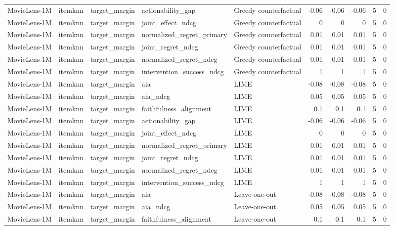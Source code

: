 \begin{table}[t]
{\begin{tabular}{lllllrrrrr}
MovieLens-1M & itemknn & target\_margin & actionability\_gap & Greedy counterfactual & -0.06 & -0.06 & -0.06 & 5 & 0 \\
MovieLens-1M & itemknn & target\_margin & joint\_effect\_ndcg & Greedy counterfactual & 0 & 0 & 0 & 5 & 0 \\
MovieLens-1M & itemknn & target\_margin & normalized\_regret\_primary & Greedy counterfactual & 0.01 & 0.01 & 0.01 & 5 & 0 \\
MovieLens-1M & itemknn & target\_margin & joint\_regret\_ndcg & Greedy counterfactual & 0.01 & 0.01 & 0.01 & 5 & 0 \\
MovieLens-1M & itemknn & target\_margin & normalized\_regret\_ndcg & Greedy counterfactual & 0.01 & 0.01 & 0.01 & 5 & 0 \\
MovieLens-1M & itemknn & target\_margin & intervention\_success\_ndcg & Greedy counterfactual & 1 & 1 & 1 & 5 & 0 \\
MovieLens-1M & itemknn & target\_margin & aia & LIME & -0.08 & -0.08 & -0.08 & 5 & 0 \\
MovieLens-1M & itemknn & target\_margin & aia\_ndcg & LIME & 0.05 & 0.05 & 0.05 & 5 & 0 \\
MovieLens-1M & itemknn & target\_margin & faithfulness\_alignment & LIME & 0.1 & 0.1 & 0.1 & 5 & 0 \\
MovieLens-1M & itemknn & target\_margin & actionability\_gap & LIME & -0.06 & -0.06 & -0.06 & 5 & 0 \\
MovieLens-1M & itemknn & target\_margin & joint\_effect\_ndcg & LIME & 0 & 0 & 0 & 5 & 0 \\
MovieLens-1M & itemknn & target\_margin & normalized\_regret\_primary & LIME & 0.01 & 0.01 & 0.01 & 5 & 0 \\
MovieLens-1M & itemknn & target\_margin & joint\_regret\_ndcg & LIME & 0.01 & 0.01 & 0.01 & 5 & 0 \\
MovieLens-1M & itemknn & target\_margin & normalized\_regret\_ndcg & LIME & 0.01 & 0.01 & 0.01 & 5 & 0 \\
MovieLens-1M & itemknn & target\_margin & intervention\_success\_ndcg & LIME & 1 & 1 & 1 & 5 & 0 \\
MovieLens-1M & itemknn & target\_margin & aia & Leave-one-out & -0.08 & -0.08 & -0.08 & 5 & 0 \\
MovieLens-1M & itemknn & target\_margin & aia\_ndcg & Leave-one-out & 0.05 & 0.05 & 0.05 & 5 & 0 \\
MovieLens-1M & itemknn & target\_margin & faithfulness\_alignment & Leave-one-out & 0.1 & 0.1 & 0.1 & 5 & 0 \\

\end{tabular}}
\end{table}

